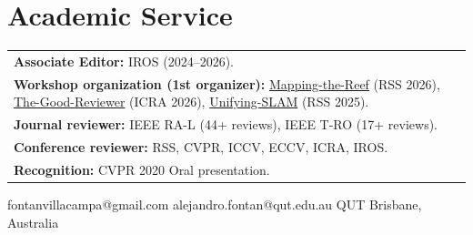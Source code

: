 \documentclass[lighthipster]{simplehipstercv}
\begin{document}
\begin{minipage}[t]{0.42\textwidth}
\section*{Academic Service}
\begin{tabular}{p{}}
    \textbf{Associate Editor:} IROS (2024--2026). \\[0.6em]
    \textbf{Workshop organization (1st organizer):} \href{https://alejandrofontan.github.io/Mapping-the-Reef-RSS26/}{Mapping-the-Reef} (RSS 2026), \href{https://alejandrofontan.github.io/The-Good-Reviewer-ICRA26/}{The-Good-Reviewer} (ICRA 2026), \href{https://visual-slam-lab.github.io/unifying-visual-slam/}{Unifying-SLAM} (RSS 2025). \\[0.6em]
    \textbf{Journal reviewer:} IEEE RA-L (44+ reviews), IEEE T-RO (17+ reviews). \\[0.6em]
    \textbf{Conference reviewer:} RSS, CVPR, ICCV, ECCV, ICRA, IROS. \\[0.6em]
    \textbf{Recognition:} CVPR 2020 Oral presentation. \\
\end{tabular}
\end{minipage}

\vspace{1em}
\setlength{\parindent}{0pt}
\begin{center}\fontfamily{\sfdefault}\selectfont \color{black!70}
{\footnotesize fontanvillacampa@gmail.com  alejandro.fontan@qut.edu.au  QUT  Brisbane, Australia}
\end{center}
\end{document}
